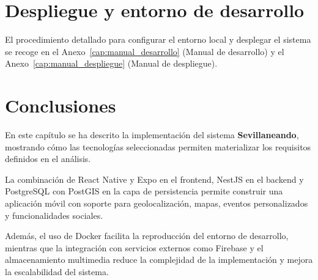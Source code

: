 \section{Despliegue y entorno de desarrollo}

El procedimiento detallado para configurar el entorno local y desplegar el sistema se recoge en el Anexo~\ref{cap:manual_desarrollo} (Manual de desarrollo) y el Anexo~\ref{cap:manual_despliegue} (Manual de despliegue).

\section{Conclusiones}

En este capítulo se ha descrito la implementación del sistema \textbf{Sevillaneando}, mostrando cómo las tecnologías seleccionadas permiten materializar los requisitos definidos en el análisis.

La combinación de React Native y Expo en el frontend, NestJS en el backend y PostgreSQL con PostGIS en la capa de persistencia permite construir una aplicación móvil con soporte para geolocalización, mapas, eventos personalizados y funcionalidades sociales.

Además, el uso de Docker facilita la reproducción del entorno de desarrollo, mientras que la integración con servicios externos como Firebase y el almacenamiento multimedia reduce la complejidad de la implementación y mejora la escalabilidad del sistema.
